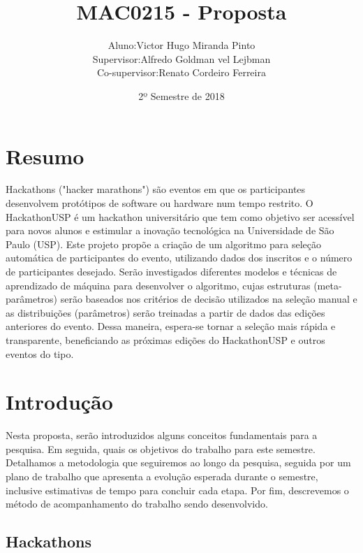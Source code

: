 \documentclass[10pt,twoside,a4paper]{article}
\title{MAC0215 - Proposta}
\author{
  \begin{tabular}{rl}
    Aluno:      & Victor Hugo Miranda Pinto \\
    Supervisor: & Alfredo Goldman vel Lejbman \\
    Co-supervisor: & Renato Cordeiro Ferreira
  \end{tabular}
}
\date{2º Semestre de 2018}
\begin{document}
\onehalfspacing

\maketitle

\section{Resumo}
  Hackathons ("hacker marathons") são eventos em que os participantes desenvolvem protótipos de software ou hardware num tempo restrito. O HackathonUSP é um hackathon universitário que tem como objetivo ser acessível para novos alunos e estimular a inovação tecnológica na Universidade de São Paulo (USP). Este projeto propõe a criação de um algoritmo para seleção automática de participantes do evento, utilizando dados dos inscritos e o número de participantes desejado. Serão investigados diferentes modelos e técnicas de aprendizado de máquina para desenvolver o algoritmo, cujas estruturas (meta-parâmetros) serão baseados nos critérios de decisão utilizados na seleção manual e as distribuições (parâmetros) serão treinadas a partir de dados das edições anteriores do evento. Dessa maneira, espera-se tornar a seleção mais rápida e transparente, beneficiando as próximas edições do HackathonUSP e outros eventos do tipo.

\section{Introdução}

    Nesta proposta, serão introduzidos alguns conceitos fundamentais para a pesquisa. Em seguida, quais os objetivos do trabalho para este semestre. Detalhamos a metodologia que seguiremos ao longo da pesquisa, seguida por um plano de trabalho que apresenta a evolução esperada durante o semestre, inclusive estimativas de tempo para concluir cada etapa. Por fim, descrevemos o método de acompanhamento do trabalho sendo desenvolvido.

  \subsection{Hackathons}
  
\end{document}
